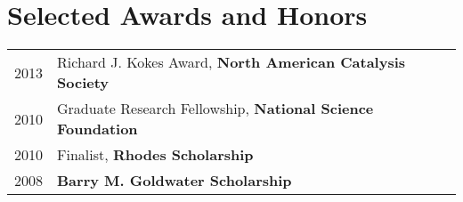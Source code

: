 \documentclass[a4paper,10pt]{article}
\begin{document}
\section{Selected Awards and Honors}
\begin{tabular}{ll}
2013 & Richard J. Kokes Award, \textbf{North American Catalysis Society} \\
2010 & Graduate Research Fellowship, \textbf{National Science Foundation} \\
2010 & Finalist, \textbf{Rhodes Scholarship} \\
2008 & \textbf{Barry M. Goldwater Scholarship} \\
\end{tabular}

\begin{refsection}
\nocite{Dagdelen2017,Mathew2017,C7CP02855E,Montoya2017a,Montoya2017,Latimer2016,Seitz2016,Sandberg2016,Tsai2016,Wang2015,Bertheussen2016,Doyle2015,Montoya2015,Montoya2015a,Schaal2007,Montoya2014,Hansen2013,Montoya2013}
%
\printbibliography
\end{refsection}
\vspace{0.2in}
\begin{refsection}
\nocite{Montoya2017b,Winter2017,Singh2017,Singh2017a}
\printbibliography[title=Forthcoming Publications]
\end{refsection}
\vspace{0.2in}
\end{document}
